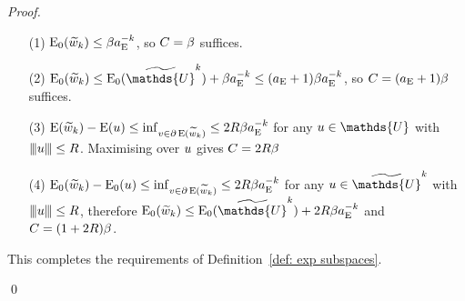 \documentclass[smallextended]{svjour3}
\let\F\mathds\let\C\mathcal\newcommand{\R}{\F{R}}\newcommand{\A}{\tens{A}}
\newcommand{\Norm}[1]{{\left\vert\kern-0.25ex\left\vert\kern-0.25ex\left\vert #1 \right\vert\kern-0.25ex\right\vert\kern-0.25ex\right\vert}}
\newcommand{\op}[1]{\operatorname{#1}}
\newcommand{\1}{\F{1}}
\newcommand*{\var}[1]{%
	\IfEqCase{#1}{%
		{0}{u}%
		{1}{v}%
		{2}{w}%
	}[u#1]%
}
\newcommand*{\vars}[1]{%
	\IfEqCase{#1}{%
		{0}{\alpha}%
		{1}{\beta}%
		{2}{\gamma}%
		{3}{a}%
		{4}{b}%
		{5}{c}%
	}[k#1]%
}
\begin{document}
\begin{proof}
{			\begin{itemize}
				\item[(1)] $\op{E}_0(\tilde{\var2}_k)\leq \vars1\aE^{-k}$, so $C=\vars1$ suffices.
				\item[(2)] $\op{E}_0(\tilde{\var2}_k)\leq \op{E}_0(\tilde{\F{U}}^k) + \vars1\aE^{-k} \leq (\aE +1)\beta\aE^{-k}$, so $C=(\aE +1)\beta$ suffices.
				\item[(3)] $\op{E}(\tilde{\var2}_k)-\op{E}(\var0)\leq \inf_{\var1\in\partial\op{E}(\tilde{\var2}_k)}\leq 2R\vars1\aE^{-k}$ for any $\var0\in\F{U}$ with $\Norm{\var0}\leq R$. Maximising over $\var0$ gives $C=2R\vars1$
				\item[(4)] $\op{E}_0(\tilde{\var2}_k)-\op{E}_0(\var0)\leq \inf_{\var1\in\partial\op{E}(\tilde{\var2}_k)}\leq 2R\vars1\aE^{-k}$ for any $\var0\in\tilde{\F{U}}^k$ with $\Norm{\var0}\leq R$, therefore $\op{E}_0(\tilde{\var2}_k) \leq \op{E}_0(\tilde{\F{U}}^k) + 2R\vars1\aE^{-k}$ and $C=(1+2R)\vars1$.
			\end{itemize}
			This completes the requirements of Definition~\ref{def: exp subspaces}.
		}
		\qed\end{proof}
	
	
\end{document}

